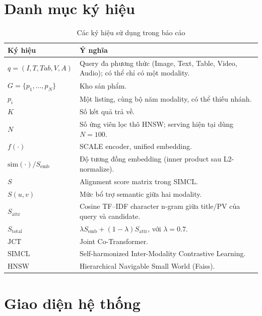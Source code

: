 \documentclass[10pt,conference]{IEEEtran}
\begin{document}

\clearpage
\onecolumn
\renewcommand{\appendixname}{Phụ lục}
\appendices
\section{Danh mục ký hiệu}
\label{app:notation}

\begin{table}[htbp]
\centering
\caption{Các ký hiệu sử dụng trong báo cáo}
\label{tab:notation}
\small
\renewcommand{\arraystretch}{1.16}
\setlength{\tabcolsep}{7pt}
\begin{tabular}{L{4.0cm} L{12.8cm}}
\toprule
\textbf{Ký hiệu} & \textbf{Ý nghĩa} \\
\midrule
$q = (I, T, Tab, V, A)$ & Query đa phương thức (Image, Text, Table, Video, Audio); có thể chỉ có một modality. \\
$G = \{p_1, \ldots, p_N\}$ & Kho sản phẩm. \\
$p_i$ & Một listing, cùng bộ năm modality, có thể thiếu nhánh. \\
$K$ & Số kết quả trả về. \\
$N$ & Số ứng viên lọc thô HNSW; serving hiện tại dùng $N=100$. \\
$f(\cdot)$ & SCALE encoder, unified embedding. \\
$\mathrm{sim}(\cdot) / S_{\mathrm{emb}}$ & Độ tương đồng embedding (inner product sau L2-normalize). \\
$S$ & Alignment score matrix trong SIMCL. \\
$S(u, v)$ & Mức bổ trợ semantic giữa hai modality. \\
$S_{\mathrm{attr}}$ & Cosine TF--IDF character n-gram giữa title/PV của query và candidate. \\
$S_{\mathrm{total}}$ & $\lambda S_{\mathrm{emb}} + (1-\lambda) S_{\mathrm{attr}}$, với $\lambda=0.7$. \\
$\mathrm{JCT}$ & Joint Co-Transformer. \\
$\mathrm{SIMCL}$ & Self-harmonized Inter-Modality Contrastive Learning. \\
$\mathrm{HNSW}$ & Hierarchical Navigable Small World (Faiss). \\
\bottomrule
\end{tabular}
\end{table}

\clearpage
\section{Giao diện hệ thống}
\label{app:frontend}
\end{document}
